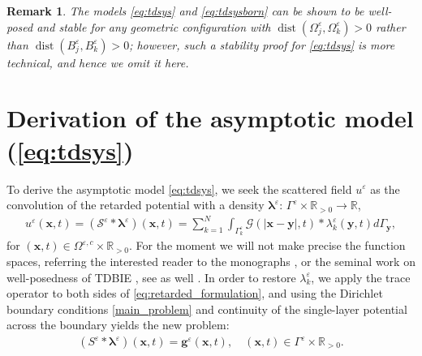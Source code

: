 \documentclass[]{article}
\newtheorem{remark}{Remark}
\numberwithin{equation}{section}
\numberwithin{theorem}{section}
\numberwithin{lemma}{section}
\numberwithin{corollary}{section}
\numberwithin{proposition}{section}
\numberwithin{definition}{section}
\newcommand{\bg}{\boldsymbol{g}}
\newcommand{\blambda}{\boldsymbol{\lambda}}
\newcommand{\re}{\varepsilon}
\renewcommand{\vec}{\boldsymbol}
\begin{document}
	\begin{remark}
		The models \eqref{eq:tdsys} and \eqref{eq:tdsysborn} can be shown to be well-posed and stable for any geometric configuration with  $\operatorname{dist}(\Omega_j^{\re}, \Omega_k^{\re})>0$ rather than $\operatorname{dist}(B^{\re}_j, B^{\re}_k) >0 $; however, such a stability proof for \eqref{eq:tdsys} is more technical, and hence we omit it here. 
	\end{remark}
	
	\section{Derivation of the asymptotic model (\ref{eq:tdsys})}
	\label{sec:model}	
	
	To derive the asymptotic model \eqref{eq:tdsys}, we seek the scattered field $u^{\re}$ as the convolution of the retarded potential with a density $\vec{\lambda}^{\re}: \, \Gamma^{\re}\times \mathbb{R}_{>0}\rightarrow \mathbb{R}$,
	\begin{align}
		\label{eq:retarded_formulation}		
		u^{\re}(\boldsymbol{x}, t) = (\mathcal{S}^{\re} * \blambda^{\re})(\boldsymbol{x}, t) = \sum_{k=1}^{N} \int_{\Gamma^{\re}_k}  \mathcal{G}(|\boldsymbol{x} - \boldsymbol{y}|, t)* \lambda^{\re}_k (\boldsymbol{y}, t)  d\Gamma_{\boldsymbol{y}},
	\end{align}
	for $(\boldsymbol{x}, t) \in \Omega^{\re,c} \times \mathbb{R}_{>0}$. For the moment we will not make precise the function spaces, referring the interested reader to the monographs \cite{sayas, banjai_sayas}, or the seminal work  on well-posedness of TDBIE \cite{bamberger_ha_duong}, see as well \cite{lubich94}. In order to restore $\lambda^{\re}_k$, we apply the trace operator to both sides of \eqref{eq:retarded_formulation}, and using the Dirichlet boundary conditions \eqref{main_problem} and continuity of the single-layer potential across the boundary yields the new problem:
	\begin{align}
		\label{eq:SL_BIE_TD}
		(S^{\re} * \blambda^{\re}) (\boldsymbol{x},t) = \bg^{\re}(\boldsymbol{x}, t), \quad (\boldsymbol{x}, t) \in \Gamma^{\re} \times \mathbb{R}_{>0}.
	\end{align}
\end{document}
